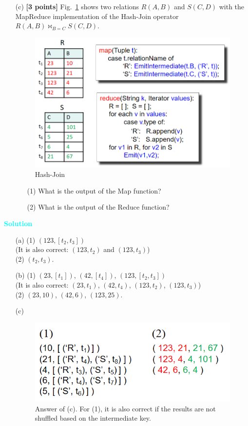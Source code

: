 \documentclass[10pt]{article}
\newenvironment{solution}
    { \begin{mdframed}[backgroundcolor=gray!10] \textcolor{cyan}{\textbf{Solution}} \\}
    {  \end{mdframed}}
\begin{document}
\begin{enumerate}
\begin{itemize}
		      \item[(c)] \textbf{[3 points]}  Fig.~\ref{mr3} shows two relations $R(A,B)$ and $S(C,D)$ with the MapReduce implementation of the Hash-Join operator $R(A,B) \bowtie_{B=C} S(C,D)$.
		            \begin{figure}[H]
			            \centering
			            \includegraphics[width=0.55\linewidth]{mr_join}
			            \caption{Hash-Join}
			            \label{mr3}
		            \end{figure}
		            \begin{itemize}
			            \item[(1)] What is the output of the Map function?
			            \item[(2)] What is the output of the Reduce function?
		            \end{itemize}
	      \end{itemize}
	      \begin{solution}
		      \begin{itemize}
			      \item[(a)] (1) $(123,[t_2,t_3])$ \\ 
				  (It is also correct: $(123,t_2)$ and $(123,t_3)$) \\ (2) $(t_2,t_3)$.
			      \item[(b)] (1) $(23,[t_1])$, $(42,[t_4])$, $(123,[t_2,t_3])$ \\
			      (It is also correct: $(23,t_1)$, $(42,t_4)$, $(123,t_2)$, $(123,t_3)$)  
				  \\ (2) $(23,10)$, $(42,6)$, $(123,25)$.
			      \item[(c)]
			            \begin{figure}[H]
				            \centering
				            \includegraphics[width=0.45\linewidth]{mr_sol}
							\caption{Answer of (c). For (1), it is also correct if the results are not shuffled based on the intermediate key.}
			            \end{figure}
		      \end{itemize}
	      \end{solution}


\end{enumerate}
\end{document}
